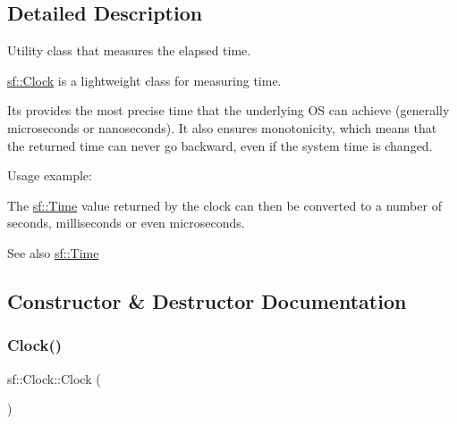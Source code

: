 \subsection{Detailed Description}
Utility class that measures the elapsed time. 

\begin{DoxyVerb}\end{DoxyVerb}


\mbox{\hyperlink{classsf_1_1_clock}{sf\+::\+Clock}} is a lightweight class for measuring time.

Its provides the most precise time that the underlying OS can achieve (generally microseconds or nanoseconds). It also ensures monotonicity, which means that the returned time can never go backward, even if the system time is changed.

Usage example\+: 
\begin{DoxyCode}{0}
\end{DoxyCode}


The \mbox{\hyperlink{classsf_1_1_time}{sf\+::\+Time}} value returned by the clock can then be converted to a number of seconds, milliseconds or even microseconds.

\begin{DoxySeeAlso}{See also}
\mbox{\hyperlink{classsf_1_1_time}{sf\+::\+Time}} \begin{DoxyVerb}\end{DoxyVerb}
 
\end{DoxySeeAlso}


\subsection{Constructor \& Destructor Documentation}
\mbox{\label{classsf_1_1_clock_abbc959c7830ca7c3a4da133cb506d3fd}} 
\subsubsection{\texorpdfstring{Clock()}{Clock()}}
{\footnotesize\ttfamily sf\+::\+Clock\+::\+Clock (\begin{DoxyParamCaption}{ }\end{DoxyParamCaption})}



